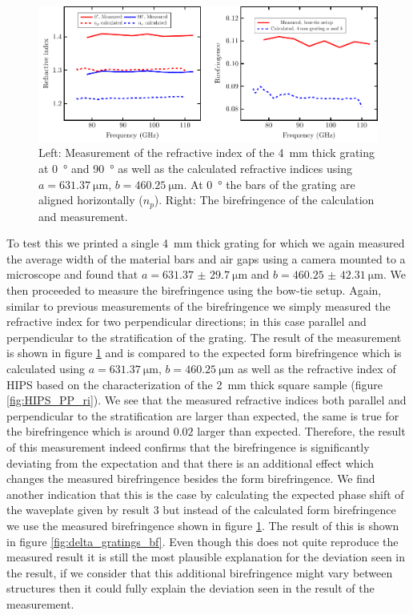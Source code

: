 \begin{figure}[H]
    \centering
    \includegraphics[scale=.65]{images/results/plots/polymer/ri_slim_grating.pdf}
    \caption{Left: Measurement of the refractive index of the \SI{4}{\milli \meter} thick grating at \SI{0}{\degree} and \SI{90}{\degree} as well as the calculated refractive indices using $a=\SI{631.37}{\micro \meter}$, $b=\SI{460.25}{\micro\meter}$. At \SI{0}{\degree} the bars of the grating are aligned horizontally ($n_p$). Right: The birefringence of the calculation and measurement.}
    \label{fig:ri_slim_grating}
\end{figure}

To test this we printed a single \SI{4}{\milli \meter} thick grating for which we again measured the average width of the material bars and air gaps using a camera mounted to a microscope and found that $a=\SI[separate-uncertainty = true]{631.37(2970)}{\micro \meter}$ and $b=\SI[separate-uncertainty = true]{460.25(4231)}{\micro \meter}$. We then proceeded to measure the birefringence using the bow-tie setup. Again, similar to previous measurements of the birefringence we simply measured the refractive index for two perpendicular directions; in this case parallel and perpendicular to the stratification of the grating. The result of the measurement is shown in figure \ref{fig:ri_slim_grating} and is compared to the expected form birefringence which is calculated using $a=\SI{631.37}{\micro \meter}$, $b=\SI{460.25}{\micro \meter}$ as well as the refractive index of HIPS based on the characterization of the \SI{2}{\milli \meter} thick square sample (figure \ref{fig:HIPS_PP_ri}). We see that the measured refractive indices both parallel and perpendicular to the stratification are larger than expected, the same is true for the birefringence which is around $0.02$ larger than expected. Therefore, the result of this measurement indeed confirms that the birefringence is significantly deviating from the expectation and that there is an additional effect which changes the measured birefringence besides the form birefringence. We find another indication that this is the case by calculating the expected phase shift of the waveplate given by result 3 but instead of the calculated form birefringence we use the measured birefringence shown in figure \ref{fig:ri_slim_grating}. The result of this is shown in figure \ref{fig:delta_gratings_bf}. Even though this does not quite reproduce the measured result it is still the most plausible explanation for the deviation seen in the result, if we consider that this additional birefringence might vary between structures then it could fully explain the deviation seen in the result of the measurement.

